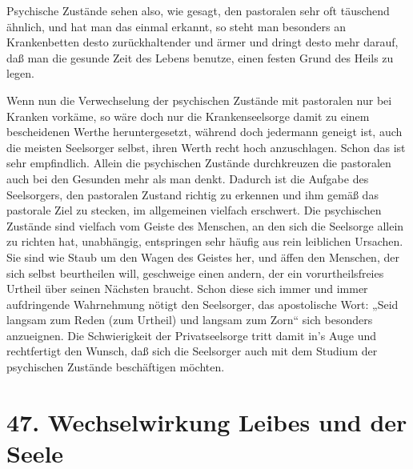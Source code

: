 Psychische Zustände sehen also, wie gesagt, den pastoralen sehr oft täuschend ähnlich, und hat man das einmal erkannt, so steht man besonders an Krankenbetten desto zurückhaltender und ärmer und dringt desto mehr darauf, daß man die gesunde Zeit des Lebens benutze, einen festen Grund des Heils zu legen.

Wenn nun die Verwechselung der psychischen Zustände mit pastoralen nur bei Kranken vorkäme, so wäre doch nur die Krankenseelsorge damit zu einem bescheidenen Werthe heruntergesetzt, während doch jedermann geneigt ist, auch die meisten Seelsorger selbst, ihren Werth recht hoch anzuschlagen. Schon das ist sehr empfindlich. Allein die psychischen Zustände durchkreuzen die pastoralen auch bei den Gesunden mehr als man denkt. Dadurch ist die Aufgabe des Seelsorgers, den pastoralen Zustand richtig zu erkennen und ihm gemäß das pastorale Ziel zu stecken, im allgemeinen vielfach erschwert. Die psychischen Zustände sind vielfach vom Geiste des Menschen, an den sich die Seelsorge allein zu richten hat, unabhängig, entspringen sehr häufig aus rein leiblichen Ursachen. Sie sind wie Staub um den Wagen des Geistes her, und äffen den Menschen, der sich selbst beurtheilen will, geschweige einen andern, der ein vorurtheilsfreies Urtheil über seinen
Nächsten braucht. Schon diese sich immer und immer aufdringende Wahrnehmung nötigt den Seelsorger, das apostolische Wort: „Seid langsam zum Reden (zum Urtheil) und langsam zum Zorn“ sich besonders anzueignen. Die Schwierigkeit der Privatseelsorge tritt damit in’s Auge und rechtfertigt den Wunsch, daß sich die Seelsorger auch mit dem Studium der psychischen Zustände beschäftigen möchten.

\section{47. Wechselwirkung Leibes und der Seele}

